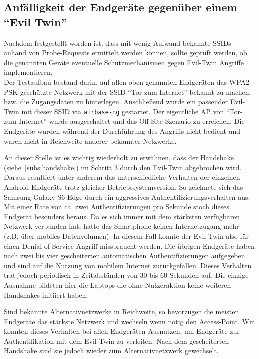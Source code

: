 \subsection{Anfälligkeit der Endgeräte gegenüber einem \enquote{Evil Twin}}
Nachdem festgestellt worden ist, dass mit wenig Aufwand bekannte SSIDs anhand von Probe-Requests ermittelt werden können, sollte geprüft werden, ob die genannten Geräte eventuelle Schutzmechanismen gegen Evil-Twin Angriffe implementieren.\\

Der Testaufbau bestand darin, auf allen oben genannten Endgeräten das WPA2-PSK geschützte Netzwerk mit der SSID \enquote{Tor-zum-Internet} bekannt zu machen, bzw. die Zugangsdaten zu hinterlegen.
Anschließend wurde ein passender Evil-Twin mit dieser SSID via \texttt{airbase-ng} gestartet. Der eigentliche AP von \enquote{Tor-zum-Internet} wurde ausgeschaltet und das Off-Site-Szenario zu erreichen.
Die Endgeräte wurden während der Durchführung des Angriffs nicht bedient und waren nicht in Reichweite anderer bekannter Netzwerke.

An dieser Stelle ist es wichtig wiederholt zu erwähnen, dass der Handshake (siehe~\ref{subs:handshake}) im Schritt 3 durch den Evil-Twin abgebrochen wird.
Daraus resultiert unter anderem das unterschiedliche Verhalten der einzelnen Android-Endgeräte trotz gleicher Betriebssystemversion.
So zeichnete sich das Samsung Galaxy S6 Edge durch ein aggressives Authentifizierungsverhalten aus: Mit einer Rate von ca. zwei Authentifizierungen pro Sekunde stoch dieses Endgerät besonders heraus.
Da es sich immer mit dem stärksten verfügbaren Netzwerk verbunden hat, hatte das Smartphone keinen Internetzugang mehr (z.B. über mobiles Datenvolumen).
In diesem Fall konnte der Evil-Twin also für einen Denial-of-Service Angriff missbraucht werden.
Die übrigen Endgeräte haben nach zwei bis vier gescheiterten automatischen Authentifizierungen aufgegeben und sind auf die Nutzung von mobilem Internet zurückgefallen.
Dieses Verhalten trat jedoch periodisch in Zeitabständen von 30 bis 60 Sekunden auf.
Die einzige Ausnahme bildeten hier die Laptops die ohne Nutzeraktion keine weiteren Handshakes initiiert haben.

Sind bekannte Alternativnetzwerke in Reichweite, so bevorzugen die meisten Endgeräte das stärkste Netzwerk und wechseln wenn nötig den Access-Point.
Wir konnten dieses Verhalten bei allen Endgeräten Ausnutzen, um Endgeräte zur Authentifikation mit dem Evil-Twin zu verleiten.
Nach dem gescheiterten Handshake sind sie jedoch wieder zum Alternativnetzwerk gewechselt.

